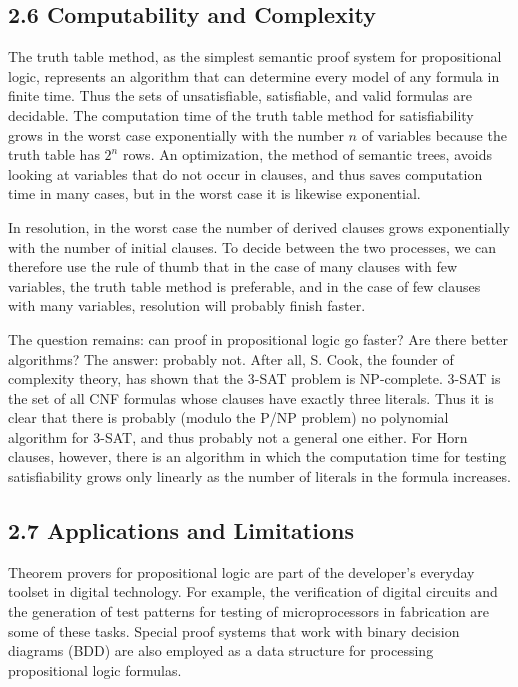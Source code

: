 \documentclass[10pt]{book}
\begin{document}
\subsection*{2.6 Computability and Complexity}
The truth table method, as the simplest semantic proof system for propositional logic, represents an algorithm that can determine every model of any formula in finite time. Thus the sets of unsatisfiable, satisfiable, and valid formulas are decidable. The computation time of the truth table method for satisfiability grows in the worst case exponentially with the number $n$ of variables because the truth table has $2^{n}$ rows. An optimization, the method of semantic trees, avoids looking at variables that do not occur in clauses, and thus saves computation time in many cases, but in the worst case it is likewise exponential.

In resolution, in the worst case the number of derived clauses grows exponentially with the number of initial clauses. To decide between the two processes, we can therefore use the rule of thumb that in the case of many clauses with few variables, the truth table method is preferable, and in the case of few clauses with many variables, resolution will probably finish faster.

The question remains: can proof in propositional logic go faster? Are there better algorithms? The answer: probably not. After all, S. Cook, the founder of complexity theory, has shown that the 3-SAT problem is NP-complete. 3-SAT is the set of all CNF formulas whose clauses have exactly three literals. Thus it is clear that there is probably (modulo the P/NP problem) no polynomial algorithm for 3-SAT, and thus probably not a general one either. For Horn clauses, however, there is an algorithm in which the computation time for testing satisfiability grows only linearly as the number of literals in the formula increases.

\subsection*{2.7 Applications and Limitations}
Theorem provers for propositional logic are part of the developer's everyday toolset in digital technology. For example, the verification of digital circuits and the generation of test patterns for testing of microprocessors in fabrication are some of these tasks. Special proof systems that work with binary decision diagrams (BDD) are also employed as a data structure for processing propositional logic formulas.
\end{document}
